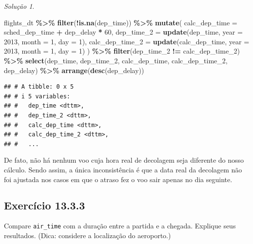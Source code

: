 \documentclass[
]{latex/krantz}
\newenvironment{Shaded}{\begin{snugshade}}{\end{snugshade}}
\newcommand{\AttributeTok}[1]{\textcolor[rgb]{0.13,0.29,0.53}{#1}}
\newcommand{\DecValTok}[1]{\textcolor[rgb]{0.00,0.00,0.81}{#1}}
\newcommand{\FunctionTok}[1]{\textcolor[rgb]{0.13,0.29,0.53}{\textbf{#1}}}
\newcommand{\NormalTok}[1]{#1}
\newcommand{\SpecialCharTok}[1]{\textcolor[rgb]{0.81,0.36,0.00}{\textbf{#1}}}
\theoremstyle{definition}
\theoremstyle{definition}
\theoremstyle{definition}
\theoremstyle{definition}
\theoremstyle{remark}
\newtheorem*{solution}{Solução}
\begin{document}
\begin{solution}
\begin{Shaded}
\begin{Highlighting}[]
\NormalTok{flights\_dt }\SpecialCharTok{\%\textgreater{}\%}
  \FunctionTok{filter}\NormalTok{(}\SpecialCharTok{!}\FunctionTok{is.na}\NormalTok{(dep\_time)) }\SpecialCharTok{\%\textgreater{}\%}
  \FunctionTok{mutate}\NormalTok{(}
    \AttributeTok{calc\_dep\_time =}\NormalTok{ sched\_dep\_time }\SpecialCharTok{+}\NormalTok{ dep\_delay }\SpecialCharTok{*} \DecValTok{60}\NormalTok{,}
    \AttributeTok{dep\_time\_2 =} \FunctionTok{update}\NormalTok{(dep\_time, }\AttributeTok{year =} \DecValTok{2013}\NormalTok{, }\AttributeTok{month =} \DecValTok{1}\NormalTok{, }\AttributeTok{day =} \DecValTok{1}\NormalTok{),}
    \AttributeTok{calc\_dep\_time\_2 =} \FunctionTok{update}\NormalTok{(calc\_dep\_time, }\AttributeTok{year =} \DecValTok{2013}\NormalTok{, }\AttributeTok{month =} \DecValTok{1}\NormalTok{, }\AttributeTok{day =} \DecValTok{1}\NormalTok{)}
\NormalTok{  ) }\SpecialCharTok{\%\textgreater{}\%}
  \FunctionTok{filter}\NormalTok{(dep\_time\_2 }\SpecialCharTok{!=}\NormalTok{ calc\_dep\_time\_2) }\SpecialCharTok{\%\textgreater{}\%}
  \FunctionTok{select}\NormalTok{(dep\_time, dep\_time\_2, calc\_dep\_time, calc\_dep\_time\_2, dep\_delay) }\SpecialCharTok{\%\textgreater{}\%}
  \FunctionTok{arrange}\NormalTok{(}\FunctionTok{desc}\NormalTok{(dep\_delay))}
\end{Highlighting}
\end{Shaded}

\begin{verbatim}
## # A tibble: 0 x 5
## # i 5 variables:
## #   dep_time <dttm>,
## #   dep_time_2 <dttm>,
## #   calc_dep_time <dttm>,
## #   calc_dep_time_2 <dttm>,
## #   ...
\end{verbatim}

De fato, não há nenhum voo cuja hora real de decolagem seja diferente do nosso cálculo. Sendo assim, a única inconsistência é que a data real da decolagem não foi ajustada nos casos em que o atraso fez o voo sair apenas no dia seguinte.
\end{solution}

\hypertarget{exr13-3-3}{%
\subsection*{Exercício 13.3.3}\label{exr13-3-3}}

Compare \texttt{air\_time} com a duração entre a partida e a chegada. Explique seus resultados. (Dica: considere a localização do aeroporto.)
\end{document}
